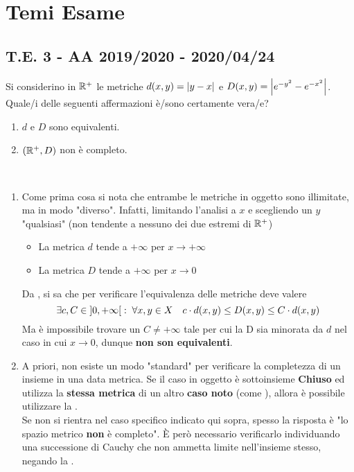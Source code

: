 \begingroup %
\renewcommand\theexercise{\arabic{exercise}} %
\chapter{Temi Esame}
\section{T.E. 3 - AA 2019/2020 - 2020/04/24}
\begin{exercise}
\end{exercise}
\begin{exercise}
\end{exercise}
\begin{exercise}
	Si considerino in $\mathbb{R}^+$ le metriche $d(x, y) = \left|y - x\right|$ e $D(x, y) = \left|e^{-y^2} - e^{-x^2}\right|$.  Quale/i delle seguenti affermazioni è/sono certamente vera/e?
	\begin{enumerate}[noitemsep]
		\item $d$ e $D$ sono equivalenti.
		\item $(\mathbb{R}^+, D)$ non è completo.
	\end{enumerate}
	\begin{solution}~
		\begin{enumerate}
			\item
				Come prima cosa si nota che entrambe le metriche in oggetto sono illimitate, ma in modo "diverso". Infatti, limitando l'analisi a $x$ e scegliendo un $y$ "qualsiasi" (non tendente a nessuno dei due estremi di $\mathbb{R}^+$)
				\begin{itemize}
					\item La metrica $d$ tende a $+\infty$ per $x \to +\infty$
					\item La metrica $D$ tende a $+\infty$ per $x \to 0$
				\end{itemize}
				Da , si sa che per verificare l'equivalenza delle metriche deve valere
				\[\exists c,C \in \left]0,+\infty\right[:\; \forall x,y \in X \quad c \cdot d(x,y) \leq D (x,y) \leq C \cdot d (x,y)\]
				Ma è impossibile trovare un $C \neq +\infty$ tale per cui la D sia minorata da $d$ nel caso in cui $x \to 0$, dunque \textbf{non son equivalenti}.
			\item
				A priori, non esiste un modo "standard" per verificare la completezza di un insieme in una data metrica. Se il caso in oggetto è sottoinsieme \textbf{Chiuso} ed utilizza la \textbf{stessa metrica} di un altro \textbf{caso noto} (come ), allora è possibile utilizzare la .\\
				Se non si rientra nel caso specifico indicato qui sopra, spesso la risposta è "lo spazio metrico \textbf{non} è completo". È però necessario verificarlo individuando una successione di Cauchy che non ammetta limite nell'insieme stesso, negando la .


\end{enumerate}
\end{solution}
\end{exercise}
